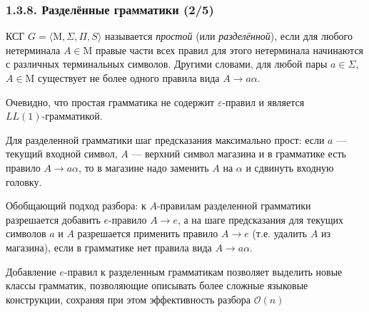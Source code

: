 \documentclass[mathserif,12pt,aspectratio=169]{beamer}
\renewcommand{\index}[1]{}
\def\odmkey#1#2{{\it\color{red} #1}\index{#2}}
\let\cal\mathcal
\begin{document}
\begin{frame}
\frametitle{1.3.8. Разделённые грамматики (2/5)}

КСГ $G=\langle \mathrm{M}, \Sigma, \Pi, S \rangle$ называется \odmkey{простой}{Грамматика!простая}
(или \odmkey{разделённой}{Грамматика!разделённая}),
если для любого нетерминала $A \in\mathrm{M}$
правые части всех правил для этого нетерминала
начинаются с различных терминальных символов.
Другими словами, для любой пары $a\in \Sigma$, $A\in \mathrm{M}$
существует не более одного правила вида $A\to a\alpha$. 
\begin{remark}
Очевидно, что простая грамматика не содержит $\varepsilon$-правил
и является \\$LL(1)$-грамматикой.
\end{remark}
Для разделенной грамматики шаг предсказания максимально прост: если \( a \) — текущий входной символ, \( A \) — верхний символ магазина и в грамматике есть правило \( A \to a \alpha \), то в магазине надо заменить \( A \) на \( \alpha \) и сдвинуть входную головку. 

\smallskip
Обобщающий подход разбора: к \( A \)-правилам разделенной грамматики разрешается добавить \( e \)-правило \( A \to e \), а на шаге предсказания для текущих символов \( a \) и \( A \) разрешается применить правило \( A \to e \) (т.е. удалить \( A \) из магазина), если в грамматике нет правила вида \( A \to a \alpha{} \).

\begin{remark}
 Добавление \( e \)-правил к разделенным грамматикам позволяет выделить новые классы грамматик, позволяющие описывать более сложные языковые конструкции, сохраняя при этом эффективность разбора $\cal{O}(n)$
\end{remark}

\end{frame}
\end{document}
